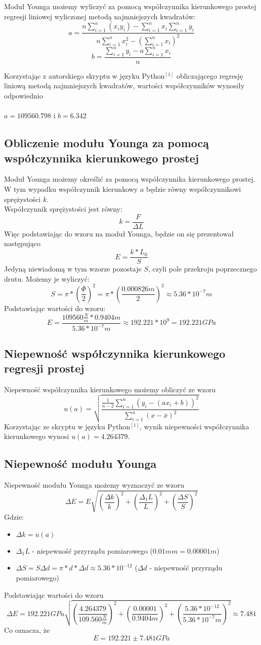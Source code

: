 \documentclass{article}
\begin{document}
{Moduł Younga możemy wyliczyć za pomocą współczynnika kierunkowego prostej regresji liniowej wyliczonej metodą najmniejszych kwadratów:
\[a = \frac{n\sum^n_{i=1}(x_iy_i) -\sum^n_{i=1}x_i\sum^n_{i=1}y_i}{n\sum^n_{i=1}x_i^2-(\sum^n_{i=1}x_i)^2}\]
\[b = \frac{\sum^n_{i=1}y_i-a\sum^n_{i=1}x_i}{n}\]

Korzystając z autorskiego skryptu w języku Python$^{[1]}$ obliczającego regresję liniową metodą najmniejszych kwadratów, wartości współczynników wynosiły odpowiednio \\
\textbf{} \\
$a = 109560.798$ i $b = 6.342$

\subsection*{Obliczenie modułu Younga za pomocą współczynnika kierunkowego prostej}
Moduł Younga możemy określić za pomocą współczynnika kierunkowego prostej. W tym wypadku współczynnik kierunkowy $a$ będzie równy współczynnikowi sprężystości $k$. \\
Współczynnik sprężystości jest równy:
\[k = \frac{F}{\Delta L}\]
Więc podstawiając do wzoru na moduł Younga, będzie on się prezentował następująco
\[E = \frac{k*L_0}{S}\]
Jedyną niewiadomą w tym wzorze pozostaje $S$, czyli pole przekroju poprzecznego drutu. Możemy je wyliczyć:
\[S = \pi*(\frac{\Phi}{2})^2=\pi*(\frac{0.000826m}{2})^2\approx5.36*10^{-7}m\]
Podstawiając wartości do wzoru:
\[E = \frac{109560\frac{N}{m}*0.9404m}{5.36*10^{-7}m}\approx192.221*10^{9}=192.221 GPa\]

\subsection*{Niepewność współczynnika kierunkowego regresji prostej}
Niepewność współczynnika kierunkowego możemy obliczyć ze wzoru
\[u(a) = \sqrt{\frac{\frac{1}{n-2}\sum^n_{i=1}(y_i-(ax_i+b))^2}{\sum^n_{i=1}(x-\bar x)^2}}\]
Korzystając ze skryptu w języku Python$^{[1]}$, wynik niepewności współczynnika kierunkowego wynosi $u(a) = 4.264379$. \\

\subsection*{Niepewność modułu Younga}
Niepewność modułu Younga możemy wyznaczyć ze wzoru
\[\Delta E = E\sqrt{(\frac{\Delta k}{k})^2+(\frac{\Delta_1 L}{L})^2+(\frac{\Delta S}{S})^2}\]
Gdzie:
\begin{itemize}
    \item $\Delta k = u(a)$
    \item $\Delta_1 L$ - niepewność przyrządu pomiarowego ($0.01mm=0.00001m$)
    \item $\Delta S = S\Delta d = \pi*d*\Delta d \approx 5.36*10^{-12}$ ($\Delta d$ - niepewność przyrządu pomiarowego)
\end{itemize}
Podstawiając wartości do wzoru
\[\Delta E = 192.221GPa\sqrt{(\frac{4.264379}{109.560\frac{N}{m}})^2+(\frac{0.00001}{0.9404m})^2+(\frac{5.36*10^{-12}}{5.36*10^{-7}m})^2}\approx7.481\]
Co oznacza, że
\[E = 192.221\pm 7.481GPa\]

}
\end{document}
